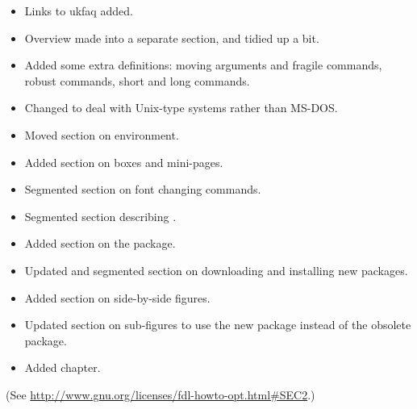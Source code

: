 \begin{itemize}
\item Links to \gls{ukfaq} added.
\item Overview made into a separate section, and tidied up a bit.
\item Added some extra definitions: moving arguments and fragile
commands, robust commands, short and long commands.
\item Changed  to deal with
Unix-type systems rather than MS-DOS.
\item Moved section on  environment.
\item Added section on boxes and mini-pages.
\item Segmented section on font changing commands.
\item Segmented section describing .
\item Added section on the  package.
\item Updated and segmented section on downloading and installing
new packages.
\item Added section on side-by-side figures.
\item Updated section on sub-figures to use the new 
package instead of the obsolete  package.
\item Added  chapter.
\end{itemize}

\backcoverheading
(See \url{http://www.gnu.org/licenses/fdl-howto-opt.html#SEC2}.)

\backcovertext

